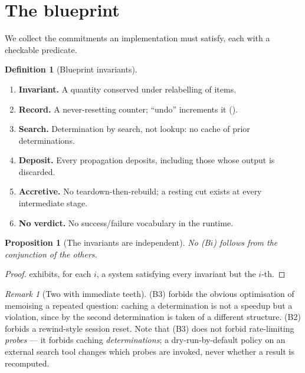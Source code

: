 \documentclass[twocolumn,11pt,a4paper]{article}
\theoremstyle{sup}
\newtheorem{proposition}[theorem]{Proposition}
\theoremstyle{definition}
\newtheorem{definition}[theorem]{Definition}
\theoremstyle{remark}
\newtheorem{remark}[theorem]{Remark}
\begin{document}
\section{The blueprint}
\label{sec:blueprint}

We collect the commitments an implementation must satisfy, each with a
checkable predicate.

\begin{definition}[Blueprint invariants]
\label{def:invariants}
\begin{enumerate}[label=\textup{(B\arabic*)},leftmargin=2.6em,itemsep=2pt]
\item \textbf{Invariant.} A quantity conserved under relabelling of items.
\item \textbf{Record.} A never-resetting counter; ``undo'' increments it
().
\item \textbf{Search.} Determination by search, not lookup: no cache of prior
determinations.
\item \textbf{Deposit.} Every propagation deposits, including those whose
output is discarded.
\item \textbf{Accretive.} No teardown-then-rebuild; a resting cut exists at
every intermediate stage.
\item \textbf{No verdict.} No success/failure vocabulary in the runtime.
\end{enumerate}
\end{definition}

\begin{proposition}[The invariants are independent]
\label{prop:indep}
No (B$i$) follows from the conjunction of the others.
\end{proposition}

\begin{proof}
\citet[Prop.~17.2]{sachikonye2025directional} exhibits, for each $i$, a system
satisfying every invariant but the $i$-th.
\end{proof}

\begin{remark}[Two with immediate teeth]
\label{rem:teeth}
(B3) forbids the obvious optimisation of memoising a repeated question: caching
a determination is not a speedup but a violation, since by
 the second determination is taken of a different
structure. (B2) forbids a rewind-style session reset. Note that (B3) does not
forbid rate-limiting \emph{probes} --- it forbids caching \emph{determinations};
a dry-run-by-default policy on an external search tool changes which probes are
invoked, never whether a result is recomputed.
\end{remark}
\end{document}

